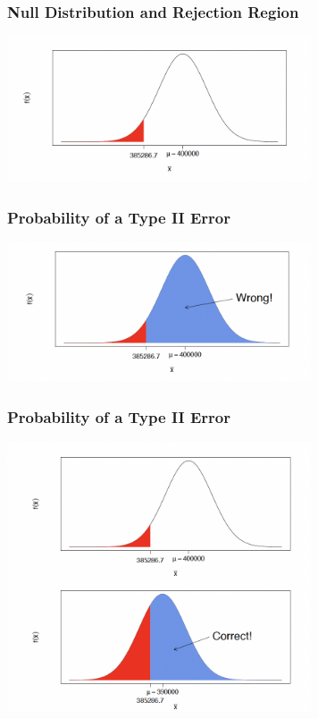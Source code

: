 \documentclass[14pt]{beamer}
\begin{document}
\begin{frame}
	\frametitle{Null Distribution and Rejection Region}
	\centering
\includegraphics[width=9cm]{null2.png}	
\end{frame}
\begin{frame}
	\frametitle{Probability of a Type II Error}
	\centering
	\includegraphics[width=9cm]{type2.png}	
\end{frame}
\begin{frame}
	\frametitle{Probability of a Type II Error}
	\centering
	\includegraphics[width=9cm]{type22.png}	
\end{frame}
\end{document}
